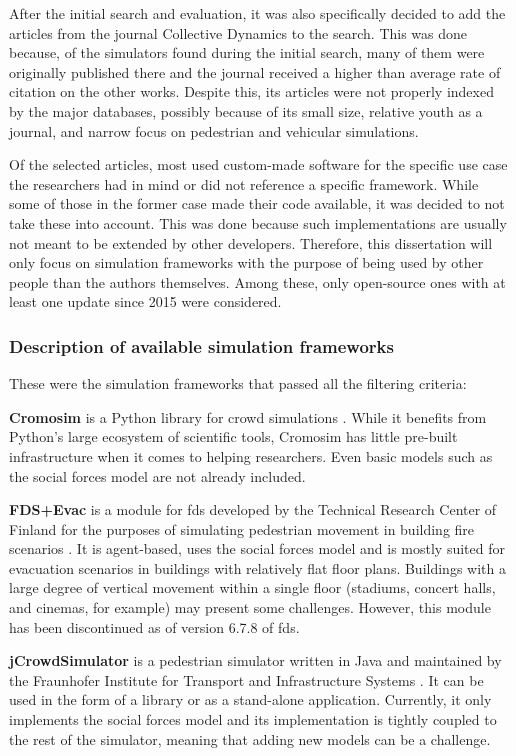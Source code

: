 \documentclass[twoside, 11pt]{article}
\begin{document}
After the initial search and evaluation, it was also specifically decided to add the articles from the journal Collective Dynamics to the search. This was done because, of the simulators found during the initial search, many of them were originally published there and the journal received a higher than average rate of citation on the other works. Despite this, its articles were not properly indexed by the major databases, possibly because of its small size, relative youth as a journal, and narrow focus on pedestrian and vehicular simulations. 

Of the selected articles, most used custom-made software for the specific use case the researchers had in mind or did not reference a specific framework. While some of those in the former case made their code available, it was decided to not take these into account. This was done because such implementations are usually not meant to be extended by other developers. Therefore, this dissertation will only focus on simulation frameworks with the purpose of being used by other people than the authors themselves. Among these, only open-source ones with at least one update since 2015 were considered. 

\subsubsection{Description of available simulation frameworks}

These were the simulation frameworks that passed all the filtering criteria:

\textbf{Cromosim} is a Python library for crowd simulations \cite{cromosim}. While it benefits from Python's large ecosystem of scientific tools, Cromosim has little pre-built infrastructure when it comes to helping researchers. Even basic models such as the social forces model are not already included.

\textbf{FDS+Evac} is a module for \gls{fds} developed by the Technical Research Center of Finland for the purposes of simulating pedestrian movement in building fire scenarios \cite{korhonenFireDynamicsSimulator2009}. It is agent-based, uses the social forces model and is mostly suited for evacuation scenarios in buildings with relatively flat floor plans. Buildings with a large degree of vertical movement within a single floor (stadiums, concert halls, and cinemas, for example) may present some challenges. However, this module has been discontinued as of version 6.7.8 of \gls{fds}.

\textbf{jCrowdSimulator} is a pedestrian simulator written in Java and maintained by the Fraunhofer Institute for Transport and Infrastructure Systems \cite{meinert2019simulation}. It can be used in the form of a library or as a stand-alone application. Currently, it only implements the social forces model and its implementation is tightly coupled to the rest of the simulator, meaning that adding new models can be a challenge.
\end{document}
